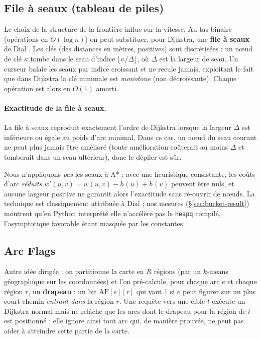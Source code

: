 \subsection{File à seaux (tableau de piles)}
\label{sec:bucket}
Le choix de la structure de la frontière influe sur la vitesse. Au tas binaire
(opérations en $O(\log n)$) on peut substituer, pour Dijkstra, une
\textbf{file à seaux} de Dial \citep{dial1969}. Les clés (des distances en
mètres, positives) sont discrétisées : un nœud de clé $\kappa$ tombe dans le seau
d'indice $\lfloor \kappa / \Delta \rfloor$, où $\Delta$ est la largeur de seau.
Un curseur balaie les seaux par indice croissant et ne recule jamais, exploitant
le fait que dans Dijkstra la clé minimale est \emph{monotone} (non décroissante).
Chaque opération est alors en $O(1)$ amorti.

\paragraph{Exactitude de la file à seaux.}
La file à seaux reproduit exactement l'ordre de Dijkstra lorsque la largeur
$\Delta$ est inférieure ou égale au poids d'arc minimal. Dans ce cas, un nœud du
seau courant ne peut plus jamais être amélioré (toute amélioration coûterait au
moins $\Delta$ et tomberait dans un seau ultérieur), donc le dépiler est sûr.

\medskip

Nous n'appliquons \emph{pas} les seaux à A* : avec une heuristique consistante,
les coûts d'arc \emph{réduits} $w'(u,v) = w(u,v) - h(u) + h(v)$ peuvent être
nuls, et aucune largeur positive ne garantit alors l'exactitude sans ré-ouvrir de
nœuds. La technique est classiquement attribuée à Dial \citep{dial1969} ; nos
mesures (\S\ref{sec:bucket-result}) montrent qu'en Python interprété elle
n'accélère pas le \texttt{heapq} compilé, l'asymptotique favorable étant masquée
par les constantes.

\subsection{Arc Flags}
\label{sec:arcflags}
Autre idée dirigée \citep{koehler2006arcflags} : on partitionne la carte en $R$
régions (par un $k$-means géographique sur les coordonnées) et l'on pré-calcule,
pour chaque arc $e$ et chaque région $r$, un \textbf{drapeau} : un bit
$\text{AF}[e][r]$ qui vaut 1 si $e$ peut figurer sur un plus court chemin
\emph{entrant dans} la région $r$. Une requête vers une cible $t$ exécute un
Dijkstra normal mais ne relâche que les arcs dont le drapeau pour la région de
$t$ est positionné : elle ignore ainsi tout arc qui, de manière prouvée, ne peut
pas aider à atteindre cette partie de la carte.

